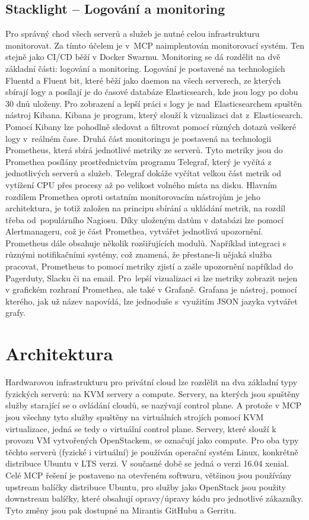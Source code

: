 \subsection{Stacklight – Logování a monitoring}
Pro správný chod všech serverů a služeb je nutné celou infrastrukturu monitorovat. Za tímto účelem je v MCP naimplentován monitorovací systém. Ten stejně jako CI/CD běží v Docker Swarmu. Monitoring se dá rozdělit na dvě základní části: logování a monitoring. Logování je postavené na technologiích Fluentd a Fluent bit, které běží jako daemon na všech serverech, ze kterých sbírají logy a posílají je do časové databáze Elasticsearch, kde jsou logy po dobu 30 dnů uloženy. Pro zobrazení a lepší práci s logy je nad Elasticsearchem spuštěn nástroj Kibana. Kibana je program, který slouží k vizualizaci dat z Elasticsearch. Pomocí Kibany lze pohodlně sledovat a filtrovat pomocí různých dotazů veškeré logy v reálném čase. Druhá část monitoringu je postavená na technologii Prometheus, která sbírá jednotlivé metriky ze serverů. Tyto metriky jsou do Promethea posílány prostřednictvím programu Telegraf, který je vyčítá z jednotlivých serverů a služeb. Telegraf dokáže vyčítat velkou část metrik od vytížení CPU přes procesy až po velikost volného místa na disku. Hlavním rozdílem Promethea oproti ostatním monitorovacím nástrojům je jeho architektura, je totiž založen na principu sbírání a ukládání metrik, na rozdíl třeba od populárního Nagiosu. Díky uloženým datům v databázi lze pomocí Alertmanageru, což je část Promethea, vytvářet jednotlivá upozornění. Prometheus dále obsahuje několik rozšiřujících modulů. Například integraci s různými notifikačními systémy, což znamená, že přestane-li nějaká služba pracovat, Prometheus to pomocí metriky zjistí a zašle upozornění například do Pagerduty, Slacku či na email. Pro lepší vizualizaci si lze metriky zobrazit nejen v grafickém rozhraní Promethea, ale také v Grafaně. Grafana je nástroj, pomocí kterého, jak už název napovídá, lze jednoduše s využitím JSON jazyka vytvářet grafy.

\section{Architektura}
Hardwarovou infrastrukturu pro privátní cloud lze rozdělit na dva základní typy fyzických serverů: na KVM servery a compute. Servery, na kterých jsou spuštěny služby starající se o ovládání cloudů, se nazývají control plane. A protože v MCP jsou všechny tyto služby spuštěny na virtuálních strojích pomocí KVM virtualizace, jedná se tedy o virtuální control plane. Servery, které slouží k provozu VM vytvořených OpenStackem, se označují jako compute. Pro oba typy těchto serverů (fyzické i virtuální) je používán operační systém Linux, konkrétně distribuce Ubuntu v LTS verzi. V současné době se jedná o verzi 16.04 xenial. Celé MCP řešení je postaveno na otevřeném softwaru, většinou jsou používány upstream balíčky distribuce Ubuntu, pro služby jako OpenStack jsou použity downstream balíčky, které obsahují opravy/úpravy kódu pro jednotlivé zákazníky. Tyto změny jsou pak dostupné na Mirantis GitHubu a Gerritu.

